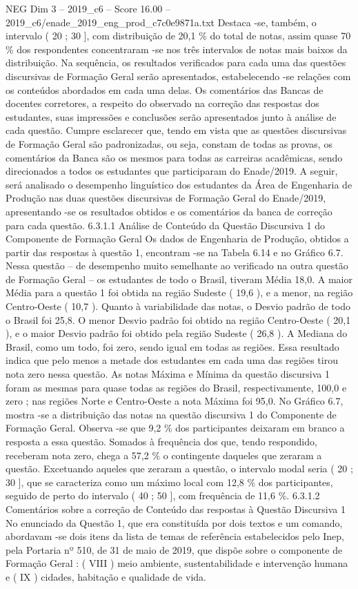 \begin{textsample}{NEG Dim 3 – 2019\_c6 – Score 16.00 – 2019\_c6/enade\_2019\_eng\_prod\_c7c0e9871a.txt}
Destaca -se, também, o intervalo ( 20 ; 30 ], com distribuição de 20,1 \% do total de notas, assim quase 70 \% dos respondentes concentraram -se nos três intervalos de notas mais baixos da distribuição.
Na sequência, os resultados verificados para cada uma das questões discursivas de Formação Geral serão apresentados, estabelecendo -se relações com os conteúdos abordados em cada uma delas.
Os comentários das Bancas de docentes corretores, a respeito do observado na correção das respostas dos estudantes, suas impressões e conclusões serão apresentados junto à análise de cada questão.
Cumpre esclarecer que, tendo em vista que as questões discursivas de Formação Geral são padronizadas, ou seja, constam de todas as provas, os comentários da Banca são os mesmos para todas as carreiras acadêmicas, sendo direcionados a todos os estudantes que participaram do Enade/2019.
A seguir, será analisado o desempenho linguístico dos estudantes da Área de Engenharia de Produção nas duas questões discursivas de Formação Geral do Enade/2019, apresentando -se os resultados obtidos e os comentários da banca de correção para cada questão. 6.3.1.1 Análise de Conteúdo da Questão Discursiva 1 do Componente de Formação Geral Os dados de Engenharia de Produção, obtidos a partir das respostas à questão 1, encontram -se na Tabela 6.14 e no Gráfico 6.7.
Nessa questão – de desempenho muito semelhante ao verificado na outra questão de Formação Geral – os estudantes de todo o Brasil, tiveram Média 18,0.
A maior Média para a questão 1 foi obtida na região Sudeste ( 19,6 ), e a menor, na região Centro-Oeste ( 10,7 ).
Quanto à variabilidade das notas, o Desvio padrão de todo o Brasil foi 25,8.
O menor Desvio padrão foi obtido na região Centro-Oeste ( 20,1 ), e o maior Desvio padrão foi obtido pela região Sudeste ( 26,8 ).
A Mediana do Brasil, como um todo, foi zero, sendo igual em todas as regiões.
Essa resultado indica que pelo menos a metade dos estudantes em cada uma das regiões tirou nota zero nessa questão.
As notas Máxima e Mínima da questão discursiva 1 foram as mesmas para quase todas as regiões do Brasil, respectivamente, 100,0 e zero ; nas regiões Norte e Centro-Oeste a nota Máxima foi 95,0.
No Gráfico 6.7, mostra -se a distribuição das notas na questão discursiva 1 do Componente de Formação Geral.
Observa -se que 9,2 \% dos participantes deixaram em branco a resposta a essa questão.
Somados à frequência dos que, tendo respondido, receberam nota zero, chega a 57,2 \% o contingente daqueles que zeraram a questão.
Excetuando aqueles que zeraram a questão, o intervalo modal seria ( 20 ; 30 ], que se caracteriza como um máximo local com 12,8 \% dos participantes, seguido de perto do intervalo ( 40 ; 50 ], com frequência de 11,6 \%. 6.3.1.2 Comentários sobre a correção de Conteúdo das respostas à Questão Discursiva 1 No enunciado da Questão 1, que era constituída por dois textos e um comando, abordavam -se dois itens da lista de temas de referência estabelecidos pelo Inep, pela Portaria nº 510, de 31 de maio de 2019, que dispõe sobre o componente de Formação Geral : ( VIII ) meio ambiente, sustentabilidade e intervenção humana e ( IX ) cidades, habitação e qualidade de vida.

\end{textsample}

